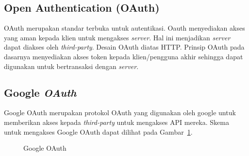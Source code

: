 \subsection{Open Authentication (OAuth)}
\label{subsec:oauth}

\hspace{0,5cm}OAuth merupakan standar terbuka untuk autentikasi. Oauth menyediakan akses yang aman kepada klien untuk mengakses \textit{server}. Hal ini menjadikan \textit{server} dapat diakses oleh \textit{third-party}. Desain OAuth diatas HTTP. Prinsip OAuth pada dasarnya menyediakan akses token kepada klien/pengguna akhir sehingga dapat digunakan untuk bertransaksi dengan \textit{server}\cite{rfc6749}.

\subsection{Google \textit{OAuth}}
\label{subsec:googleip}

\hspace{0,5cm}Google OAuth merupakan protokol OAuth yang digunakan oleh google untuk memberikan akses kepada \textit{third-party} untuk mengakses API mereka. Skema untuk mengakses Google OAuth dapat dilihat pada Gambar~\ref{fig:google_oauth}.

\begin{figure}[h]
\centering
{}
\caption[Google OAuth]{Google OAuth} 
\label{fig:google_oauth}
\end{figure}

